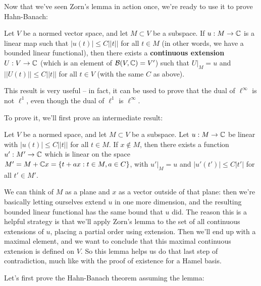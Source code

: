 Now that we've seen Zorn's lemma in action once, we're ready to use it to prove Hahn-Banach:

\begin{theorem}\label{hahn-banach}
Let $V$ be a normed vector space, and let $M \subset V$ be a subspace. If $u: M \to \mathbb C$ is a linear map such that $|u(t)| \le C||t||$ for all $t \in M$ (in other words, we have a bounded linear functional), then there exists a \textbf{continuous extension} $U: V \to \mathbb C$ (which is an element of $\mathcal{B}(V, \mathbb C) = V'$) such that $U|_M = u$ and $||U(t)|| \le C||t||$ for all $t \in V$ (with the same $C$ as above). 
\end{theorem}

This result is very useful -- in fact, it can be used to prove that the dual of $\ell^{\infty}$ is not $\ell^1$, even though the dual of $\ell^1$ is $\ell^{\infty}$.

To prove it, we'll first prove an intermediate result:

\begin{lemma}\label{hahnbanachlemma}
Let $V$ be a normed space, and let $M \subset V$ be a subspace. Let $u: M \to \mathbb C$ be linear with $|u(t)| \le C||t||$ for all $t \in M$. If $x \not \in M$, then there exists a function $u': M' \to \mathbb C$ which is linear on the space $M' = M + \mathbb C x = \{t + ax: t \in M, a \in C\}$, with $u'|_M = u$ and  $|u'(t')| \le C |t'|$ for all $t' \in M'$.
\end{lemma}

We can think of $M$ as a plane and $x$ as a vector outside of that plane: then we're basically letting ourselves extend $u$ in one more dimension, and the resulting bounded linear functional has the same bound that $u$ did. The reason this is a helpful strategy is that we'll apply Zorn's lemma to the set of all continuous extensions of $u$, placing a partial order using extension. Then we'll end up with a maximal element, and we want to conclude that this maximal continuous extension is defined on $V$. So this lemma helps us do that last step of contradiction, much like with the proof of existence for a Hamel basis. 

Let's first prove the Hahn-Banach theorem assuming the lemma:


